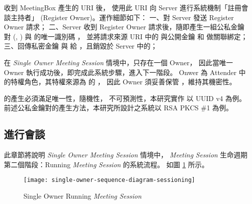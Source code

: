 \begin{steps}
            \DEFowner 收到 MeetingBox 產生的 URI 後，
        使用此 URI 向 Server 進行系統機制「註冊會談主持者」 (Register Owner)。運作細節如下：
        一、\DEFowner 對 Server 發送 Register Owner 請求；
        二、Server 收到 Register Owner 請求後，隨即產生一組公私金鑰對 (\DEFpublicKey, \DEFprivateKey)
        與 \DEFowner 的唯一識別碼 \DEFownerID，
        並將請求來源 URI 中的 \DEFsessionID 與公開金鑰 \DEFpublicKey 和 \DEFownerID 做關聯綁定；
        三、回傳私密金鑰 \DEFprivateKey 與 \DEFownerID 給 \DEFowner，且銷毀於 Server 中的\DEFprivateKey；

            在 {\it Single Owner Meeting Session} 情境中，只存在一個 Owner，
        因此當唯一 Owner 執行成功後，即完成此系統步驟，進入下一階段。
        Onwer 為 Attender 中的特權角色，其特權來源為 \DEFowner 的 \DEFprivateKey，
        因此 Owner 須妥善保管 \DEFprivateKey，維持其機密性。

            \DEFownerID 的產生必須滿足唯一性，隨機性，
        不可預測性，本研究實作 \DEFownerID 以 UUID v4 為例。
        前述公私金鑰對的產生方法，本研究所設計之系統以 RSA PKCS \#1 為例。
\end{steps}

\subsection{進行會談}
\label{subsec.sessioning}

    此章節將說明 {\it Single Owner Meeting Session} 情境中，
{\it Meeting Session} 生命週期第二個階段：Running {\it Meeting Session} 的系統流程。
如圖 \ref{fig:s-o-sessioning} 所示。

\begin{figure}[H]
    \centering
    \texttt{[image: single-owner-sequence-diagram-sessioning]}
    \caption{Single Owner Running {\it Meeting Session}}
    \label{fig:s-o-sessioning}
\end{figure}


